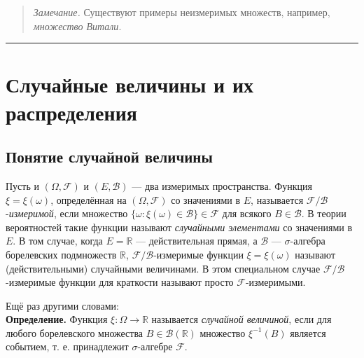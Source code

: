 \documentclass[11pt,a4paper]{article}
\renewcommand{\linethickness}{0.1ex}
\begin{document}
\begin{quote}
\emph{Замечание.} Существуют примеры неизмеримых множеств, например,
\emph{множество Витали}.
\end{quote}

    \begin{center}\rule{0.5\linewidth}{\linethickness}\end{center}

    \hypertarget{ux441ux43bux443ux447ux430ux439ux43dux44bux435-ux432ux435ux43bux438ux447ux438ux43dux44b-ux438-ux438ux445-ux440ux430ux441ux43fux440ux435ux434ux435ux43bux435ux43dux438ux44f}{%
\section{Случайные величины и их
распределения}\label{ux441ux43bux443ux447ux430ux439ux43dux44bux435-ux432ux435ux43bux438ux447ux438ux43dux44b-ux438-ux438ux445-ux440ux430ux441ux43fux440ux435ux434ux435ux43bux435ux43dux438ux44f}}

\hypertarget{ux43fux43eux43dux44fux442ux438ux435-ux441ux43bux443ux447ux430ux439ux43dux43eux439-ux432ux435ux43bux438ux447ux438ux43dux44b}{%
\subsection{Понятие случайной
величины}\label{ux43fux43eux43dux44fux442ux438ux435-ux441ux43bux443ux447ux430ux439ux43dux43eux439-ux432ux435ux43bux438ux447ux438ux43dux44b}}

Пусть и \((\Omega, \mathcal{F})\) и \((E, \mathcal{B})\) --- два
измеримых пространства. Функция \(\xi = \xi(\omega)\), определённая на
\((\Omega, \mathcal{F})\) со значениями в \(E\), называется
\(\mathcal{F}/\mathcal{B}\)-\emph{измеримой}, если множество
\(\{\omega: \xi(\omega) \in \mathcal{B}\} \in \mathcal{F}\) для всякого
\(B \in \mathcal{B}\). В теории вероятностей такие функции называют
\emph{случайными элементами} со значениями в \(E\). В том случае, когда
\(E = \mathbb{R}\) --- действительная прямая, а \(\mathcal{B}\) ---
\(\sigma\)-алгебра борелевских подмножеств \(\mathbb{R}\),
\(\mathcal{F}/\mathcal{B}\)-измеримые функции \(\xi=\xi(\omega)\)
называют (действительными) случайными величинами. В этом специальном
случае \(\mathcal{F}/\mathcal{B}\)-измеримые функции для краткости
называют просто \(\mathcal{F}\)-измеримыми.

Ещё раз другими словами:\\
\textbf{Определение.} Функция \(\xi: \Omega \rightarrow \mathbb{R}\)
называется \emph{случайной величиной}, если для любого борелевского
множества \(B \in \mathcal{B}(\mathbb{R})\) множество \(\xi^{-1}(B)\)
является событием, т. е. принадлежит \(\sigma\)-алгебре \(\mathcal{F}\).
\end{document}
